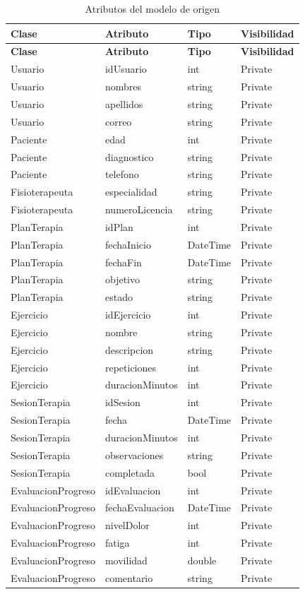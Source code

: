 \begin{longtable}{L{3.4cm}L{4.2cm}L{3cm}L{3.4cm}}
\caption{Atributos del modelo de origen}\\
\toprule
\textbf{Clase} & \textbf{Atributo} & \textbf{Tipo} & \textbf{Visibilidad} \\
\midrule
\endfirsthead
\toprule
\textbf{Clase} & \textbf{Atributo} & \textbf{Tipo} & \textbf{Visibilidad} \\
\midrule
\endhead
Usuario & idUsuario & int & Private \\
Usuario & nombres & string & Private \\
Usuario & apellidos & string & Private \\
Usuario & correo & string & Private \\
Paciente & edad & int & Private \\
Paciente & diagnostico & string & Private \\
Paciente & telefono & string & Private \\
Fisioterapeuta & especialidad & string & Private \\
Fisioterapeuta & numeroLicencia & string & Private \\
PlanTerapia & idPlan & int & Private \\
PlanTerapia & fechaInicio & DateTime & Private \\
PlanTerapia & fechaFin & DateTime & Private \\
PlanTerapia & objetivo & string & Private \\
PlanTerapia & estado & string & Private \\
Ejercicio & idEjercicio & int & Private \\
Ejercicio & nombre & string & Private \\
Ejercicio & descripcion & string & Private \\
Ejercicio & repeticiones & int & Private \\
Ejercicio & duracionMinutos & int & Private \\
SesionTerapia & idSesion & int & Private \\
SesionTerapia & fecha & DateTime & Private \\
SesionTerapia & duracionMinutos & int & Private \\
SesionTerapia & observaciones & string & Private \\
SesionTerapia & completada & bool & Private \\
EvaluacionProgreso & idEvaluacion & int & Private \\
EvaluacionProgreso & fechaEvaluacion & DateTime & Private \\
EvaluacionProgreso & nivelDolor & int & Private \\
EvaluacionProgreso & fatiga & int & Private \\
EvaluacionProgreso & movilidad & double & Private \\
EvaluacionProgreso & comentario & string & Private \\
\bottomrule
\end{longtable}

